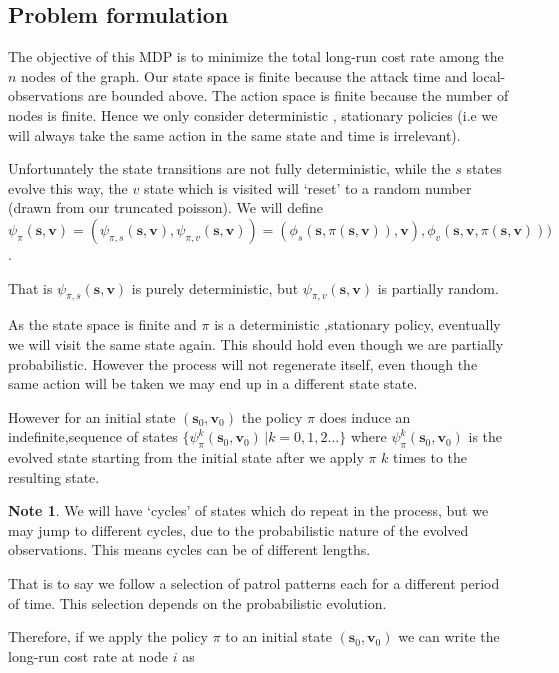 \documentclass[a4paper,10pt]{article}
\theoremstyle{definition}
\theoremstyle{definition}
\theoremstyle{remark}
\theoremstyle{definition}
\newtheorem*{note}{Note}
\begin{document}
\subsection{Problem formulation}
The objective of this MDP is to minimize the total long-run cost rate among the $n$ nodes of the graph. Our state space is finite because the attack time and local-observations are bounded above. The action space is finite because the number of nodes is finite. Hence we only consider deterministic , stationary policies (i.e we will always take the same action in the same state and time is irrelevant).

Unfortunately the state transitions are not fully deterministic, while the $s$ states evolve this way, the $v$ state which is visited will `reset' to a random number (drawn from our truncated poisson). We will define $\psi_{\pi}(\bm{s},\bm{v})=(\psi_{\pi,s}(\bm{s},\bm{v}),\psi_{\pi,v}(\bm{s},\bm{v}))=(\phi_{s}(\bm{s},\pi(\bm{s},\bm{v})),\bm{v}),\phi_{v}(\bm{s},\bm{v},\pi(\bm{s},\bm{v})))$.

That is $\psi_{\pi,s}(\bm{s},\bm{v})$ is purely deterministic, but $\psi_{\pi,v}(\bm{s},\bm{v})$ is partially random.

As the state space is finite and $\pi$ is a deterministic ,stationary policy, eventually we will visit the same state again. This should hold even though we are partially probabilistic. However the process will not regenerate itself, even though the same action will be taken we may end up in a different state state.

However for an initial state $(\bm{s}_{0},\bm{v}_{0})$ the policy $\pi$ does induce an indefinite,sequence of states $\{\psi_{\pi}^{k} (\bm{s}_{0},\bm{v}_{0}) \, | k=0,1,2... \}$ where $\psi_{\pi}^{k} (\bm{s}_{0},\bm{v}_{0})$ is the evolved state starting from the initial state after we apply $\pi$ $k$ times to the resulting state.

\begin{note}
We will have `cycles' of states which do repeat in the process, but we may jump to different cycles, due to the probabilistic nature of the evolved observations. This means cycles can be of different lengths.

That is to say we follow a selection of patrol patterns each for a different period of time. This selection depends on the probabilistic evolution. 

\end{note}

Therefore, if we apply the policy $\pi$ to an initial state $(\bm{s}_{0},\bm{v}_{0})$ we can write the long-run cost rate at node $i$ as
\end{document}

